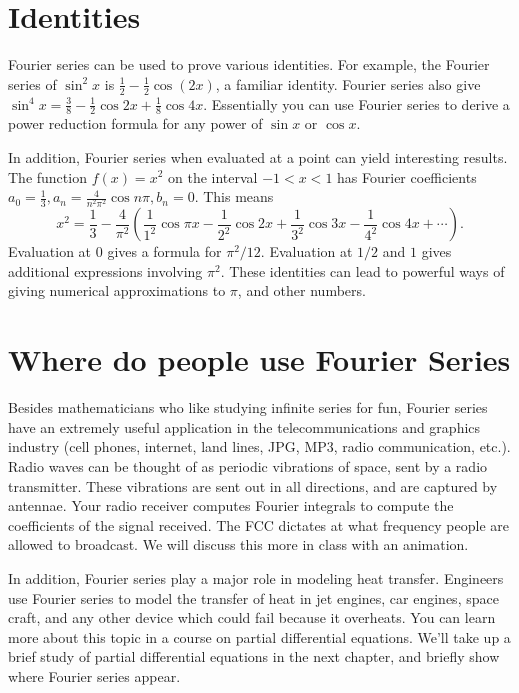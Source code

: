 \section{Identities}
Fourier series can be used to prove various identities.  For example, the Fourier series of $\sin^2 x$ is $\frac{1}{2}-\frac{1}{2}\cos(2x)$, a familiar identity.  Fourier series also give $\sin^4 x =  \frac{3}{8}-\frac{1}{2} \cos 2 x+\frac{1}{8} \cos 4 x$.  Essentially you can use Fourier series to derive a power reduction formula for any power of $\sin x$ or $\cos x$.    

In addition, Fourier series when evaluated at a point can yield interesting results. The function $f(x)=x^2$ on the interval $-1<x<1$ has Fourier coefficients $a_0=\frac{1}{3}, a_n=\frac{4}{n^2\pi^2}\cos n\pi, b_n=0$.  This means $$x^2 = \frac{1}{3}-\frac{4}{\pi^2}\left(\frac{1}{1^2}\cos \pi x -\frac{1}{2^2}\cos 2x +\frac{1}{3^2}\cos 3x-\frac{1}{4^2}\cos 4x +\cdots\right).$$  Evaluation at $0$ gives a formula for $\pi^2/12$.  Evaluation at $1/2$ and $1$ gives additional expressions involving $\pi^2$. These identities can lead to powerful ways of giving numerical approximations to $\pi$, and other numbers.

\section{Where do people use Fourier Series}
Besides mathematicians who like studying infinite series for fun, Fourier series have an extremely useful application in the telecommunications and graphics industry (cell phones, internet, land lines, JPG, MP3, radio communication, etc.).  Radio waves can be thought of as periodic vibrations of space, sent by a radio transmitter.  These vibrations are sent out in all directions, and are captured by antennae.  Your radio receiver computes Fourier integrals to compute the coefficients of the signal received.  The FCC dictates at what frequency people are allowed to broadcast.  We will discuss this more in class with an animation.

In addition, Fourier series play a major role in modeling heat transfer. Engineers use Fourier series to model the transfer of heat in jet engines, car engines, space craft, and any other device which could fail because it overheats.  You can learn more about this topic in a course on partial differential equations.  We'll take up a brief study of partial differential equations in the next chapter, and briefly show where Fourier series appear. 


